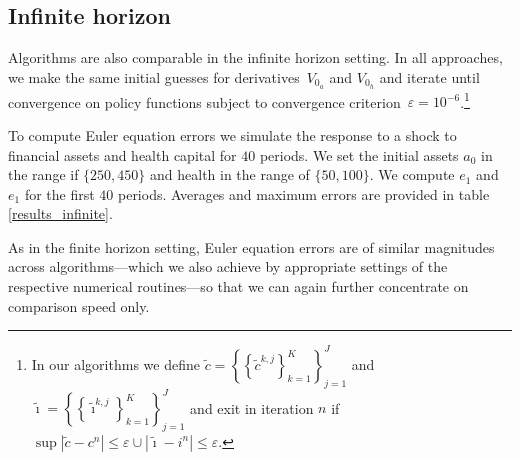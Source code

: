 \documentclass[a4paper,12pt]{article}
\begin{document}
\subsection{Infinite horizon}

Algorithms are also comparable in the infinite horizon setting. In all approaches, we make the same initial guesses for derivatives~$V_{0_{a}}$ and $V_{0_{h}}$ and iterate until convergence on policy functions subject to convergence criterion~$\varepsilon = 10^{-6}$.\footnote{In our algorithms we define $\tilde{c} = \left\{\left\{\tilde{c}^{k,j}\right\}_{k=1}^{K}\right\}_{j=1}^{J}$ and $\tilde{\imath} = \left\{\left\{\tilde{\imath}^{k,j}\right\}_{k=1}^{K}\right\}_{j=1}^{J}$ and exit in iteration $n$ if $\sup |\tilde{c}-c^{n}| \leq \varepsilon \cup |\tilde{\imath}-i^{n}| \leq \varepsilon.$}

To compute Euler equation errors we simulate the response to a shock to financial assets and health capital for $40$ periods. We set the initial assets $a_{0}$ in the range if $\{250,450\}$ and health in the range of $\{50,100\}$. We compute $e_{1}$ and $e_{1}$ for the first $40$ periods. Averages and maximum errors are provided in table \ref{results_infinite}.

As in the finite horizon setting, Euler equation errors are of similar magnitudes across algorithms---which we also achieve by appropriate settings of the respective numerical routines---so that we can again further concentrate on comparison speed only.
\end{document}
